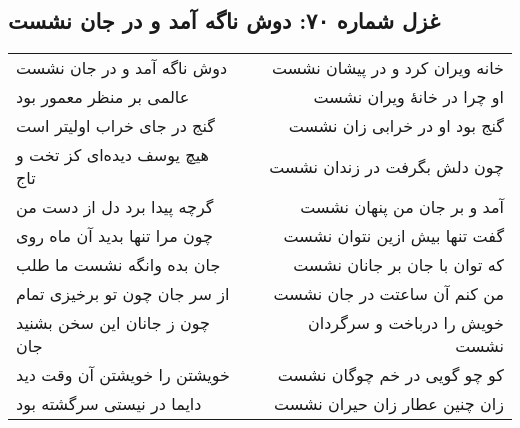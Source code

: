 \begin{center}
\section*{غزل شماره ۷۰: دوش ناگه آمد و در جان نشست}
\label{sec:070}
\begin{longtable}{l p{0.5cm} r}
دوش ناگه آمد و در جان نشست
&&
خانه ویران کرد و در پیشان نشست
\\
عالمی بر منظر معمور بود
&&
او چرا در خانهٔ ویران نشست
\\
گنج در جای خراب اولیتر است
&&
گنج بود او در خرابی زان نشست
\\
هیچ یوسف دیده‌ای کز تخت و تاج
&&
چون دلش بگرفت در زندان نشست
\\
گرچه پیدا برد دل از دست من
&&
آمد و بر جان من پنهان نشست
\\
چون مرا تنها بدید آن ماه روی
&&
گفت تنها بیش ازین نتوان نشست
\\
جان بده وانگه نشست ما طلب
&&
که توان با جان بر جانان نشست
\\
از سر جان چون تو برخیزی تمام
&&
من کنم آن ساعتت در جان نشست
\\
چون ز جانان این سخن بشنید جان
&&
خویش را درباخت و سرگردان نشست
\\
خویشتن را خویشتن آن وقت دید
&&
کو چو گویی در خم چوگان نشست
\\
دایما در نیستی سرگشته بود
&&
زان چنین عطار زان حیران نشست
\\
\end{longtable}
\end{center}
